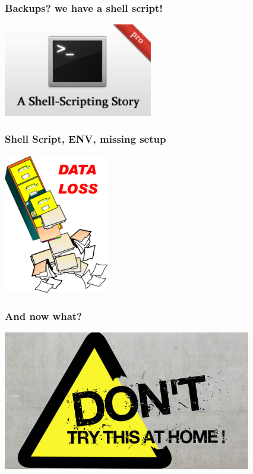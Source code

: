 \documentclass{beamer}
\begin{document}
\begin{frame}
  \frametitle{Backups? we have a shell script!}

  \begin{center}
    \includegraphics[height=1.6in]{a-shell-scripting-story.png}
  \end{center}
\end{frame}

\begin{frame}[fragile]
  \frametitle{Shell Script, ENV, missing setup}


  \begin{center}
    \includegraphics[height=2.4in]{data_loss.png}
  \end{center}
\end{frame}

\begin{frame}
  \frametitle{And now what?}

  \begin{center}
    \includegraphics[height=2.4in]{Dont-Try-This-At-Home.jpg}
  \end{center}
\end{frame}
\end{document}
